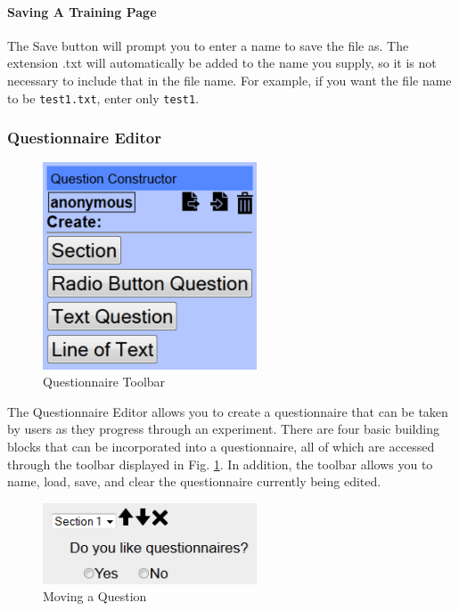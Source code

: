 \documentclass[article]{ij4uq}              %
\begin{document}
\paragraph{Saving A Training Page}
The Save button will prompt you to enter a name to save the file as. The extension .txt will automatically be added to the name you supply, so it is not necessary to include that in the file name. For example, if you want the file name to be \texttt{test1.txt}, enter only \texttt{test1}.

\subsubsection {Questionnaire Editor}

\begin{figure}[h!]
 \centering
 \includegraphics[width=2.5in]{figures/question_toolbar.png}
 \caption{Questionnaire Toolbar}
 \label{fig:questTool}
\end{figure}
\FloatBarrier

The Questionnaire Editor allows you to create a questionnaire that can be taken by users as they progress through an experiment. There are four basic building blocks that can be incorporated into a questionnaire, all of which are accessed through the toolbar displayed in Fig. \ref{fig:questTool}. In addition, the toolbar allows you to name, load, save, and clear the questionnaire currently being edited.

\begin{figure}[h!]
 \centering
 \includegraphics[width=2.5in]{figures/question_edit.png}
 \caption{Moving a Question}
 \label{fig:questEdit}
\end{figure}
\FloatBarrier
\end{document}
